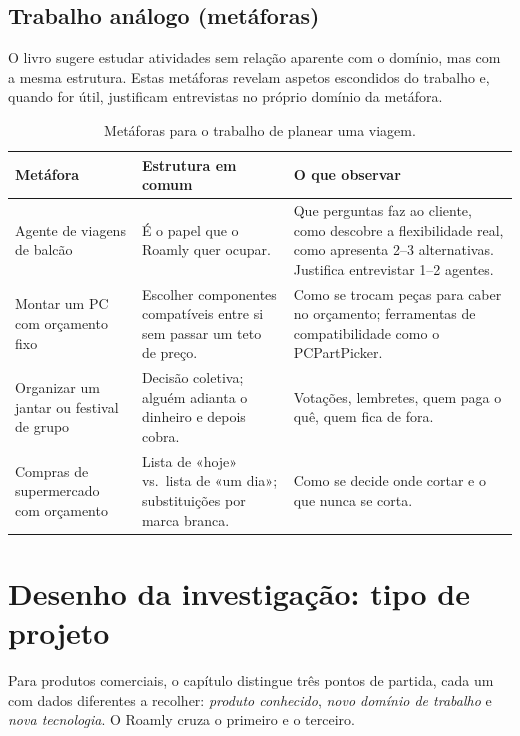 \documentclass[11pt,a4paper]{article}
\begin{document}
\subsection{Trabalho análogo (metáforas)}

O livro sugere estudar atividades sem relação aparente com o domínio, mas com a mesma estrutura. Estas metáforas revelam aspetos escondidos do trabalho e, quando for útil, justificam entrevistas no próprio domínio da metáfora.

\begin{table}[h]
\centering
\begin{tabularx}{\textwidth}{@{}p{3.4cm}LL@{}}
\toprule
\textbf{Metáfora} & \textbf{Estrutura em comum} & \textbf{O que observar} \\
\midrule
Agente de viagens de balcão & É o papel que o Roamly quer ocupar. & Que perguntas faz ao cliente, como descobre a flexibilidade real, como apresenta 2--3 alternativas. Justifica entrevistar 1--2 agentes. \\
Montar um PC com orçamento fixo & Escolher componentes compatíveis entre si sem passar um teto de preço. & Como se trocam peças para caber no orçamento; ferramentas de compatibilidade como o PCPartPicker. \\
Organizar um jantar ou festival de grupo & Decisão coletiva; alguém adianta o dinheiro e depois cobra. & Votações, lembretes, quem paga o quê, quem fica de fora. \\
Compras de supermercado com orçamento & Lista de «hoje» vs.\ lista de «um dia»; substituições por marca branca. & Como se decide onde cortar e o que nunca se corta. \\
\bottomrule
\end{tabularx}
\caption{Metáforas para o trabalho de planear uma viagem.}
\end{table}

\section{Desenho da investigação: tipo de projeto}

Para produtos comerciais, o capítulo distingue três pontos de partida, cada um com dados diferentes a recolher: \textit{produto conhecido}, \textit{novo domínio de trabalho} e \textit{nova tecnologia}. O Roamly cruza o primeiro e o terceiro.
\end{document}
